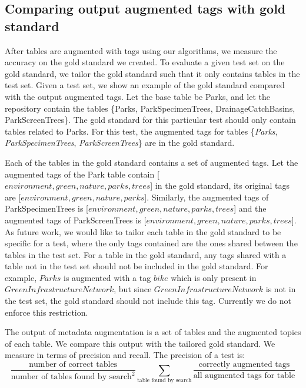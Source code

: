\subsection{Comparing output augmented tags with gold standard}
\label{ssec:ComparingOutputAugmentedTagsWithGoldStandard}

After tables are augmented with tags using our algorithms, we measure the accuracy on the gold standard we created. To evaluate a given test set on the gold standard, we tailor the gold standard such that it only contains tables in the test set. Given a test set, we show an example of the gold standard compared with the output augmented tags. Let the base table be Parks, and let the repository contain the tables \{Parks, ParkSpecimenTrees, DrainageCatchBasins, ParkScreenTrees\}. The gold standard for this particular test should only contain tables related to Parks. For this test, the augmented tags for tables \{\textit{Parks}, \textit{ParkSpecimenTrees}, \textit{ParkScreenTrees}\} are in the gold standard.

Each of the tables in the gold standard contains a set of augmented tags. Let the augmented tags of the Park table contain [$environment, green, nature, parks, trees$] in the gold standard, its original tags are [$environment, green, nature, parks$]. Similarly, the augmented tags of ParkSpecimenTrees is [$environment, green, nature, parks, trees$] and the augmented tags of ParkScreenTrees is [$environment, green, nature, parks, trees$]. As future work, we would like to tailor each table in the gold standard to be specific for a test, where the only tags contained are the ones shared between the tables in the test set. For a table in the gold standard, any tags shared with a table not in the test set should not be included in the gold standard. For example, $Parks$ is augmented with a tag $bike$ which is only present in $GreenInfrastructureNetwork$, but since $GreenInfrastructureNetwork$ is not in the test set, the gold standard should not include this tag. Currently we do not enforce this restriction.

The output of metadata augmentation is a set of tables and the augmented topics of each table. We compare this output with the tailored gold standard. We measure in terms of precision and recall. The precision of a test is:
\[
\frac{\text{number of correct tables}}{\text{number of tables found by search}^{2}}\sum\limits _{\text{table found by search}}\frac{\text{correctly augmented tags}}{\text{all augmented tags for table}}
\]

